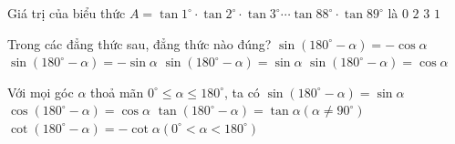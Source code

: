 

\begin{ex}%
	Giá trị của biểu thức $A=\tan 1^\circ\cdot\tan 2^\circ\cdot\tan 3^\circ\cdots\tan 88^\circ\cdot\tan  89^\circ$ là
	 \choice
		{$0$} 
		{$2$} 
		 {$3$}
		 {\True $1$}
\end{ex}

\begin{ex}%
	Trong các đẳng  thức sau, đẳng thức nào đúng?
	 \choice
		{$\sin \left(180^\circ-\alpha  \right)=-\cos \alpha$}
		{$\sin \left(180^\circ-\alpha \right)=-\sin  \alpha$}
		 {\True $\sin \left(180^\circ-\alpha \right)=\sin \alpha$}
		 {$\sin \left(180^\circ-\alpha \right)=\cos \alpha$}
\end{ex}



\begin{ex}%
	Với mọi góc $\alpha$ thoả mãn $0^{\circ} \leq \alpha \leq 180^{\circ}$,  ta có
	 \choiceTF
		{\True $\sin \left(180^{\circ}-\alpha\right)=\sin \alpha$} 
		{$\cos \left(180^{\circ}-\alpha\right)=\cos  \alpha$}
		{$\tan \left(180^{\circ}-\alpha\right)=\tan  \alpha\left(\alpha \neq 90^{\circ}\right)$}
		{\True  $\cot \left(180^{\circ}-\alpha\right)=-\cot \alpha\left(0^{\circ}<\alpha<180^{\circ}\right)$}
\end{ex}

